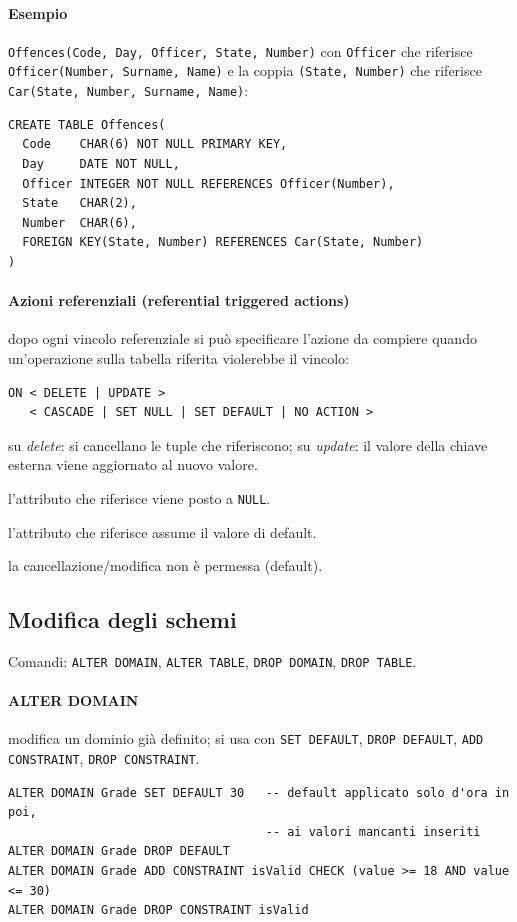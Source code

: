 \documentclass[a4paper,12pt]{article}
\begin{document}
\paragraph{Esempio} \texttt{Offences(Code, Day, Officer, State, Number)} con
\texttt{Officer} che riferisce \texttt{Officer(Number, Surname, Name)} e la
coppia \texttt{(State, Number)} che riferisce \texttt{Car(State, Number,
Surname, Name)}:
\begin{verbatim}
CREATE TABLE Offences(
  Code    CHAR(6) NOT NULL PRIMARY KEY,
  Day     DATE NOT NULL,
  Officer INTEGER NOT NULL REFERENCES Officer(Number),
  State   CHAR(2),
  Number  CHAR(6),
  FOREIGN KEY(State, Number) REFERENCES Car(State, Number)
)
\end{verbatim}

\paragraph{Azioni referenziali (referential triggered actions)} dopo ogni
vincolo referenziale si può specificare l'azione da compiere quando
un'operazione sulla tabella riferita violerebbe il vincolo:
\begin{verbatim}
ON < DELETE | UPDATE >
   < CASCADE | SET NULL | SET DEFAULT | NO ACTION >
\end{verbatim}
\begin{description}[style=nextline]
  \item[CASCADE] su \emph{delete}: si cancellano le tuple che riferiscono; su
    \emph{update}: il valore della chiave esterna viene aggiornato al nuovo
    valore.
  \item[SET NULL] l'attributo che riferisce viene posto a \texttt{NULL}.
  \item[SET DEFAULT] l'attributo che riferisce assume il valore di default.
  \item[NO ACTION] la cancellazione/modifica non è permessa (default).
\end{description}

\subsection{Modifica degli schemi}

Comandi: \texttt{ALTER DOMAIN}, \texttt{ALTER TABLE}, \texttt{DROP DOMAIN},
\texttt{DROP TABLE}.

\paragraph{ALTER DOMAIN} modifica un dominio già definito; si usa con
\texttt{SET DEFAULT}, \texttt{DROP DEFAULT}, \texttt{ADD CONSTRAINT},
\texttt{DROP CONSTRAINT}.
\begin{verbatim}
ALTER DOMAIN Grade SET DEFAULT 30   -- default applicato solo d'ora in poi,
                                    -- ai valori mancanti inseriti
ALTER DOMAIN Grade DROP DEFAULT
ALTER DOMAIN Grade ADD CONSTRAINT isValid CHECK (value >= 18 AND value <= 30)
ALTER DOMAIN Grade DROP CONSTRAINT isValid
\end{verbatim}
\end{document}

